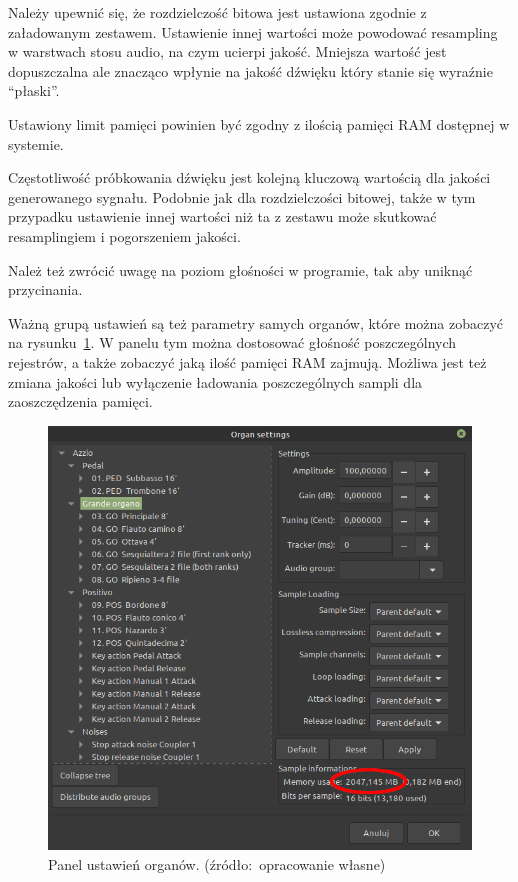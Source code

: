 \documentclass[11pt]{report}
\begin{document}
    Należy upewnić się, że rozdzielczość bitowa jest ustawiona zgodnie z załadowanym zestawem.
    Ustawienie innej wartości może powodować resampling w warstwach stosu audio, na czym ucierpi jakość.
    Mniejsza wartość jest dopuszczalna ale znacząco wpłynie na jakość dźwięku który stanie się wyraźnie ``płaski''.

    Ustawiony limit pamięci powinien być zgodny z ilością pamięci RAM dostępnej w systemie.

    Częstotliwość próbkowania dźwięku jest kolejną kluczową wartością dla jakości generowanego sygnału.
    Podobnie jak dla rozdzielczości bitowej, także w tym przypadku ustawienie innej wartości niż ta z zestawu może skutkować resamplingiem i pogorszeniem jakości.

    Należ też zwrócić uwagę na poziom głośności w programie, tak aby uniknąć przycinania.

    Ważną grupą ustawień są też parametry samych organów, które można zobaczyć na rysunku~\ref{fig:organy}.
    W panelu tym można dostosować głośność poszczególnych rejestrów, a także zobaczyć jaką ilość pamięci RAM zajmują.
    Możliwa jest też zmiana jakości lub wyłączenie ładowania poszczególnych sampli dla zaoszczędzenia pamięci.
    \begin{figure}[!ht]
        \centering
        \includegraphics[width=\linewidth]{fig/organR.png}
        \caption{Panel ustawień organów. (źródło:~opracowanie własne)}
        \label{fig:organy}
    \end{figure}
\end{document}
